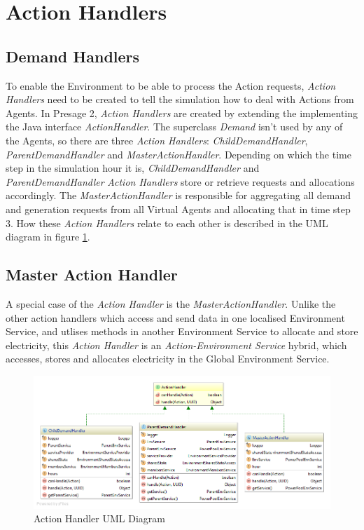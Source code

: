 \section*{Action Handlers} %
\subsection*{Demand Handlers}
To enable the Environment to be able to process the Action requests, \textit{Action Handlers} need to be created to tell the simulation how to deal with Actions from Agents. In Presage 2, \textit{Action Handlers} are created by extending the implementing the Java interface \textit{ActionHandler}. The superclass \textit{Demand} isn't used by any of the Agents, so there are three \textit{Action Handlers}:  \textit{ChildDemandHandler}, \textit{ParentDemandHandler} and \textit{MasterActionHandler}. Depending on which the time step in the simulation hour it is, \textit{ChildDemandHandler} and \textit{ParentDemandHandler} \textit{Action Handlers} store or retrieve requests and allocations accordingly. The \textit{MasterActionHandler} is responsible for aggregating all demand and generation requests from all Virtual Agents and allocating that in time step 3. How these \textit{Action Handlers} relate to each other is described in the UML diagram in figure \ref{fig:ActionHandlerUML}. 

\subsection*{Master Action Handler}
A special case of the \textit{Action Handler} is the \textit{MasterActionHandler}. Unlike the other action handlers which access and send data in one localised Environment Service, and utlises methods in another Environment Service to allocate and store electricity, this \textit{Action Handler} is an \textit{Action-Environment Service} hybrid, which accesses, stores and allocates electricity in the Global Environment Service.

\begin{figure}[!h]
	\centering
	\includegraphics[scale=0.4]{Images/ActionHandlerUML.png}
	\caption{Action Handler UML Diagram}
	\label{fig:ActionHandlerUML}
\end{figure}

